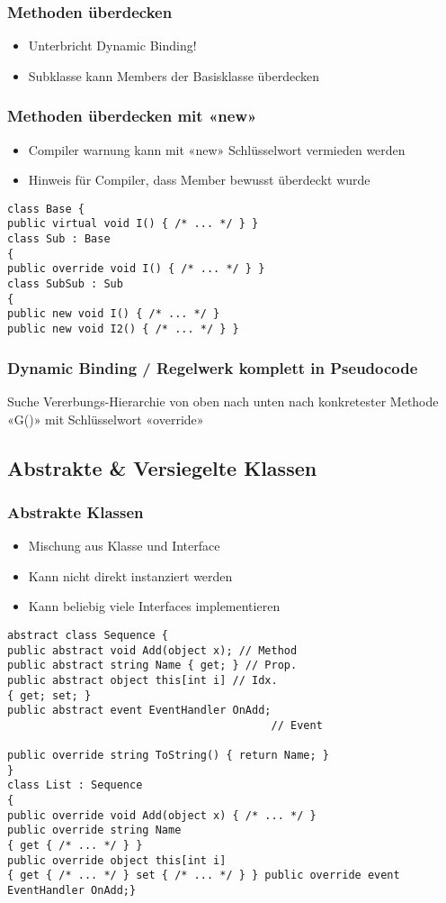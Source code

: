 \subsubsection{Methoden überdecken}
\begin{itemize}
    \item Unterbricht Dynamic Binding!
    \item Subklasse kann Members der Basisklasse überdecken
\end{itemize}
\subsubsection{Methoden überdecken mit «new»}
\begin{itemize}
    \item Compiler warnung kann mit «new» Schlüsselwort vermieden werden
    \item Hinweis für Compiler, dass Member bewusst überdeckt wurde
\end{itemize}
\begin{lstlisting}
class Base {
public virtual void I() { /* ... */ } }
class Sub : Base
{
public override void I() { /* ... */ } }
class SubSub : Sub
{
public new void I() { /* ... */ }
public new void I2() { /* ... */ } }
\end{lstlisting}

\subsubsection{Dynamic Binding / Regelwerk komplett in Pseudocode}
Suche Vererbungs-Hierarchie von oben nach unten nach konkretester Methode «G()» mit Schlüsselwort «override»


\subsection{Abstrakte \& Versiegelte Klassen}
\subsubsection{Abstrakte Klassen}
\begin{itemize}
    \item Mischung aus Klasse und Interface
    \item Kann nicht direkt instanziert werden
    \item Kann beliebig viele Interfaces implementieren
\end{itemize}
\begin{lstlisting}
abstract class Sequence {
public abstract void Add(object x); // Method
public abstract string Name { get; } // Prop.
public abstract object this[int i] // Idx.
{ get; set; }
public abstract event EventHandler OnAdd;
                                         // Event

public override string ToString() { return Name; }
}
class List : Sequence
{
public override void Add(object x) { /* ... */ }
public override string Name
{ get { /* ... */ } }
public override object this[int i]
{ get { /* ... */ } set { /* ... */ } } public override event EventHandler OnAdd;}
\end{lstlisting}
